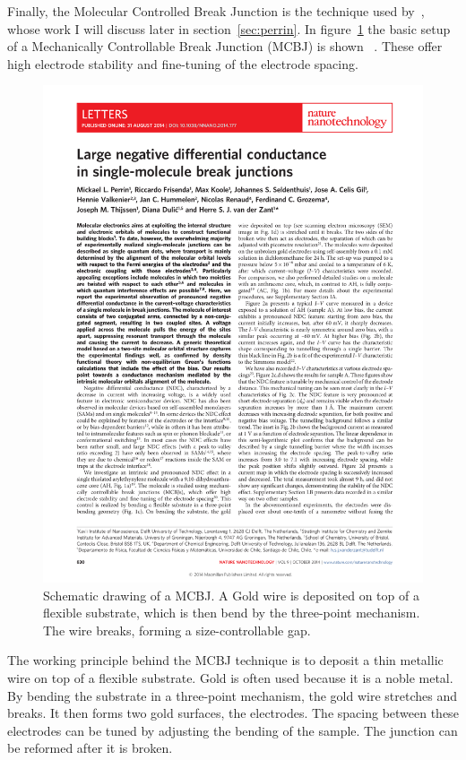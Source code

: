 Finally, the Molecular Controlled Break Junction is the technique used by~\citet{perrinnano}, whose work I will discuss later in section~\ref{sec:perrin}. In figure~\ref{fig:mcbj} the basic setup of a Mechanically Controllable Break Junction (MCBJ) is shown~\citet{perrin} . These offer high electrode stability and fine-tuning of the electrode spacing. 
\begin{figure}[!bp]
    \centering
    \includegraphics[height=0.3\textheight,page=2, clip=true, trim=2.5cm 16.5cm 11cm 6cm]{pdf/perrinnnano.pdf}
    \caption{Schematic drawing of a MCBJ. A Gold wire is deposited on top of a flexible substrate, which is then bend by the three-point mechanism. The wire breaks, forming a size-controllable gap.}
    \label{fig:mcbj}
\end{figure}

The working principle behind the MCBJ technique is to deposit a thin metallic wire on top of a flexible substrate. Gold is often used because it is a noble metal. By bending the substrate in a three-point mechanism, the gold wire stretches and breaks. It then forms two gold surfaces, the electrodes. The spacing between these electrodes can be tuned by adjusting the bending of the sample. The junction can be reformed after it is broken.

